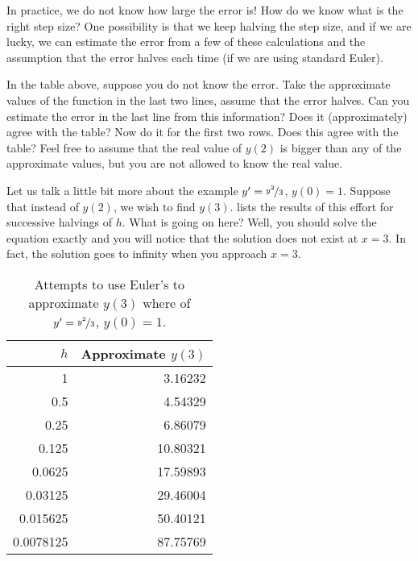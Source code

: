 In practice, we do not know how large the error is!
How do we know what is
the right step size?  One possibility is that we keep halving the step size,
and if we
are lucky, we can estimate the error from a few of these calculations and the
assumption that the error halves each time
(if we are using standard Euler).

\begin{exercise}
In the table above, suppose you do not know the error.  Take
the approximate values of the function in the last two lines,
assume that the error halves.  Can you estimate the
error in the last line from this information?  Does it (approximately) agree with the
table?  Now do it for the first two rows.  Does this agree with the table?
Feel free to assume that the real value of $y(2)$ is bigger than any of the
approximate values, but you are not allowed to know the real value.
\end{exercise}

Let us talk a little bit more about the example
$y' = \nicefrac{y^2}{3}$, $y(0) = 1$.
Suppose that instead of $y(2)$, we wish to find $y(3)$.
lists the results of this effort
for successive halvings of $h$.  What is
going on here?  Well, you should solve the equation exactly and you will
notice that the solution does not exist at $x=3$.  In fact, the solution goes
to infinity when you approach $x=3$.

\begin{table}[h!t]
\mybeginframe
\capstart
\begin{center}
\begin{tabular}{@{}rr@{}}
\toprule
$h$ & Approximate $y(3)$ \\
\midrule
1        & 3.16232 \\
0.5      & 4.54329 \\
0.25     & 6.86079 \\
0.125    & 10.80321 \\
0.0625   & 17.59893 \\
0.03125  & 29.46004 \\
0.015625 & 50.40121 \\
0.0078125& 87.75769 \\
\bottomrule
\end{tabular}
\end{center}
\caption{Attempts to use Euler's to approximate $y(3)$ where
of $y'=\nicefrac{y^2}{3}$, $y(0)=1$.\label{euler-table2:table}}
\myendframe
\end{table}

